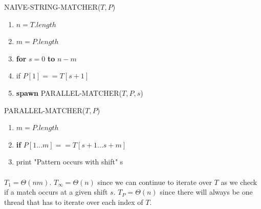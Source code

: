 \documentclass[]{memoir}
\begin{document}
\begin{enumerate}
NAIVE-STRING-MATCHER($T,P$)
\begin{enumerate}[label=\arabic*\hspace{2mm}]
	\item $n = T.length$
	\item $m = P.length$
	\item \textbf{for} $s = 0$ \textbf{to} $n-m$
	\item \hspace{1cm} if $P[1] == T[s+1]$
	\item \hspace{2cm} \textbf{spawn} PARALLEL-MATCHER($T,P,s$) 
\end{enumerate}
PARALLEL-MATCHER($T,P$)
\begin{enumerate}[label=\arabic*\hspace{2mm}]
	\item $m = P.length$
	\item \textbf{if} $P[1...m] == T[s+1...s+m]$
	\item \hspace{1cm} print "Pattern occurs with shift" s
\end{enumerate}
\paragraph{}
\begin{Large}
$T_{1} = \Theta{}(nm)$.
$T_{\infty} = \Theta{}(n)$ since we can continue to iterate over $T$ as we check if a match occurs at a given shift $s$.
$T_{P} = \Theta{}(n)$ since there will always be one thread that has to iterate over each index of $T$.
\end{Large}
\end{enumerate}
\end{document}
